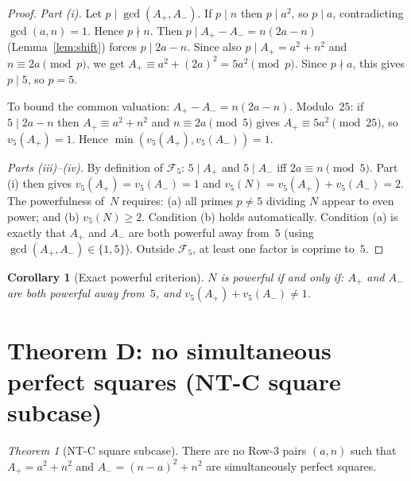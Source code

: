 \documentclass[12pt]{amsart}
\theoremstyle{plain}
\newtheorem{corollary}[theorem]{Corollary}
\theoremstyle{definition}
\theoremstyle{remark}
\newtheorem{mainthm}{Theorem}
\newcommand{\Aplus}{A_{+}}
\newcommand{\Aminus}{A_{-}}
\begin{document}
\begin{proof}
\emph{Part (i).}  Let $p\mid\gcd(\Aplus,\Aminus)$.  If $p\mid n$ then
$p\mid a^2$, so $p\mid a$, contradicting $\gcd(a,n)=1$.  Hence $p\nmid n$.
Then $p\mid\Aplus-\Aminus = n(2a-n)$ (Lemma~\ref{lem:shift}) forces $p\mid 2a-n$.  Since also
$p\mid\Aplus = a^2+n^2$ and $n\equiv 2a\pmod{p}$, we get
$\Aplus\equiv a^2+(2a)^2 = 5a^2\pmod{p}$.  Since $p\nmid a$,
this gives $p\mid 5$, so $p=5$.

To bound the common valuation: $\Aplus-\Aminus = n(2a-n)$.  Modulo~$25$:
if $5\mid 2a-n$ then $\Aplus\equiv a^2+n^2$ and $n\equiv 2a\pmod{5}$
gives $\Aplus\equiv 5a^2\pmod{25}$, so $v_5(\Aplus)=1$.
Hence $\min(v_5(\Aplus),v_5(\Aminus))=1$.

\emph{Parts (iii)--(iv).}  By definition of $\mathcal{F}_5$:
$5\mid\Aplus$ and $5\mid\Aminus$ iff $2a\equiv n\pmod{5}$.
Part (i) then gives $v_5(\Aplus)=v_5(\Aminus)=1$ and
$v_5(N)=v_5(\Aplus)+v_5(\Aminus)=2$.  The powerfulness of~$N$
requires: (a) all primes $p\neq 5$ dividing $N$ appear to even power;
and (b) $v_5(N)\geq 2$.  Condition (b) holds automatically.
Condition (a) is exactly that $\Aplus$ and $\Aminus$ are both powerful
away from~$5$ (using $\gcd(\Aplus,\Aminus)\in\{1,5\}$).
Outside $\mathcal{F}_5$, at least one factor is coprime to~$5$.
\end{proof}

\begin{corollary}[Exact powerful criterion]
\label{cor:powerful-criterion}
$N$ is powerful if and only if: $\Aplus$ and $\Aminus$ are both powerful
away from~$5$, and $v_5(\Aplus)+v_5(\Aminus)\neq 1$.
\end{corollary}

\section{Theorem D: no simultaneous perfect squares (NT-C square subcase)}
\label{sec:thmsquare}

\begin{mainthm}[NT-C square subcase]
\label{thm:square}
There are no Row-3 pairs $(a,n)$ such that $\Aplus = a^2+n^2$ and
$\Aminus = (n-a)^2+n^2$ are simultaneously perfect squares.
\end{mainthm}
\end{document}

